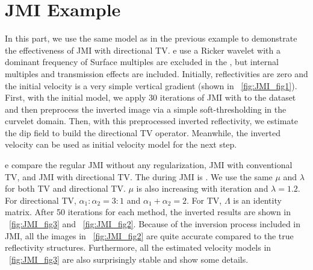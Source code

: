 \section{JMI Example}
In this part, we use the same model as in the previous example to demonstrate the effectiveness of JMI with directional TV. e use a Ricker wavelet with a  dominant frequency of   Surface multiples are excluded in the , but internal multiples and transmission effects are included. Initially, reflectivities are zero and the initial velocity is a very simple vertical gradient (shown in ~\ref{fig:JMI_fig1}). First, with the initial model, we apply 30 iterations of JMI with   to the dataset and then preprocess the inverted image via a simple soft-thresholding in the curvelet domain. Then, with this preprocessed inverted reflectivity, we estimate the dip field to build the directional TV operator. Meanwhile, the inverted velocity can be used as initial velocity model for the next step. 

e compare the regular JMI without any regularization, JMI with conventional TV, and JMI with directional TV. The  during  JMI is . We use the same $\mu$ and $\lambda$ for both  TV and directional TV. $\mu$ is also increasing with iteration and $\lambda = 1.2$. For directional TV, $\alpha_1 : \alpha_2 = 3 : 1$ and $\alpha_1 + \alpha_2 = 2$. For  TV, $\Lambda$ is an identity matrix. After 50 iterations for each method, the inverted results are shown in ~\ref{fig:JMI_fig3} and ~\ref{fig:JMI_fig2}. Because of the inversion process included in JMI, all the images in ~\ref{fig:JMI_fig2} are quite accurate compared to the true reflectivity structures. Furthermore, all the estimated velocity models in ~\ref{fig:JMI_fig3} are also surprisingly stable and show some details. 

